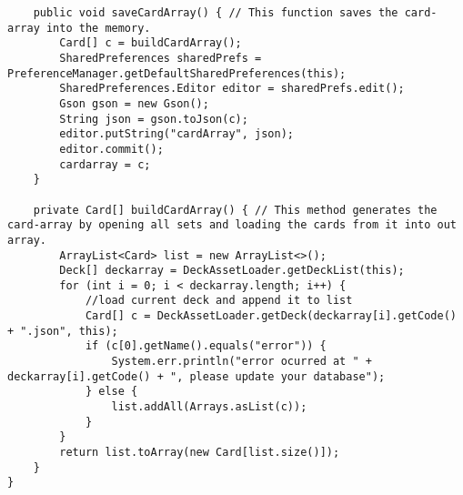 \begin{lstlisting}
    public void saveCardArray() { // This function saves the card-array into the memory.
        Card[] c = buildCardArray();
        SharedPreferences sharedPrefs = PreferenceManager.getDefaultSharedPreferences(this);
        SharedPreferences.Editor editor = sharedPrefs.edit();
        Gson gson = new Gson();
        String json = gson.toJson(c);
        editor.putString("cardArray", json);
        editor.commit();
        cardarray = c;
    }

    private Card[] buildCardArray() { // This method generates the card-array by opening all sets and loading the cards from it into out array.
        ArrayList<Card> list = new ArrayList<>();
        Deck[] deckarray = DeckAssetLoader.getDeckList(this);
        for (int i = 0; i < deckarray.length; i++) {
            //load current deck and append it to list
            Card[] c = DeckAssetLoader.getDeck(deckarray[i].getCode() + ".json", this);
            if (c[0].getName().equals("error")) {
                System.err.println("error ocurred at " + deckarray[i].getCode() + ", please update your database");
            } else {
                list.addAll(Arrays.asList(c));
            }
        }
        return list.toArray(new Card[list.size()]);
    }
}
\end{lstlisting}
\newpage
